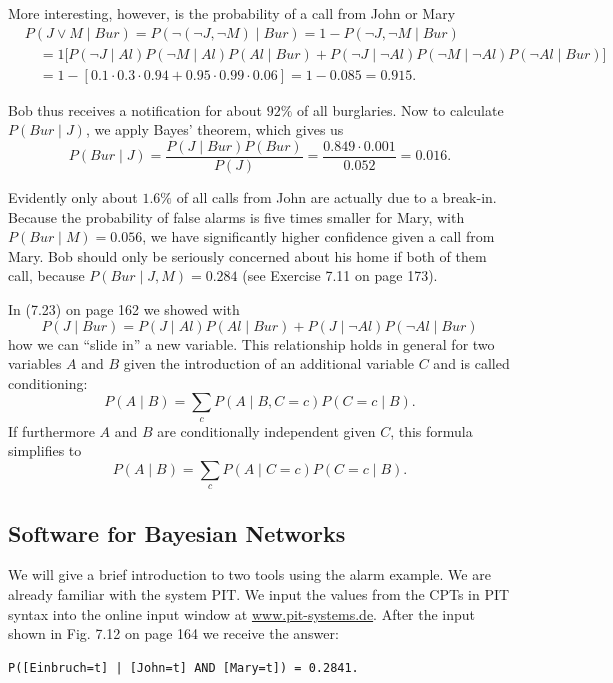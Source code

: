 \documentclass[10pt]{book}
\begin{document}
More interesting, however, is the probability of a call from John or Mary
$$
\begin{aligned}
& P(J \vee M \mid Bur)=P(\neg(\neg J, \neg M) \mid Bur)=1-P(\neg J, \neg M \mid Bur) \\
& \quad=1\bigl[P(\neg J \mid Al)P(\neg M \mid Al)P(Al \mid Bur)+P(\neg J \mid \neg Al)P(\neg M \mid \neg Al)P(\neg Al \mid Bur)\bigr] \\
& \quad=1-[0.1 \cdot 0.3 \cdot 0.94+0.95 \cdot 0.99 \cdot 0.06]=1-0.085=0.915.
\end{aligned}
$$

Bob thus receives a notification for about $92 \%$ of all burglaries. Now to calculate $P(Bur \mid J)$, we apply Bayes' theorem, which gives us
$$
P(Bur \mid J)=\frac{P(J \mid Bur)P(Bur)}{P(J)}=\frac{0.849 \cdot 0.001}{0.052}=0.016.
$$

Evidently only about $1.6 \%$ of all calls from John are actually due to a break-in. Because the probability of false alarms is five times smaller for Mary, with $P(Bur \mid M)=0.056$, we have significantly higher confidence given a call from Mary. Bob should only be seriously concerned about his home if both of them call, because $P(Bur \mid J, M)=0.284$ (see Exercise 7.11 on page 173).

In (7.23) on page 162 we showed with
$$
P(J \mid Bur)=P(J \mid Al)P(Al \mid Bur)+P(J \mid \neg Al)P(\neg Al \mid Bur)
$$
how we can ``slide in'' a new variable. This relationship holds in general for two variables $A$ and $B$ given the introduction of an additional variable $C$ and is called conditioning:
$$
P(A \mid B)=\sum_{c} P(A \mid B, C=c) P(C=c \mid B).
$$
If furthermore $A$ and $B$ are conditionally independent given $C$, this formula simplifies to
$$
P(A \mid B)=\sum_{c} P(A \mid C=c) P(C=c \mid B).
$$

\subsection{Software for Bayesian Networks}
We will give a brief introduction to two tools using the alarm example. We are already familiar with the system PIT. We input the values from the CPTs in PIT syntax into the online input window at \href{http://www.pit-systems.de}{www.pit-systems.de}. After the input shown in Fig. 7.12 on page 164 we receive the answer:
\begin{verbatim}
P([Einbruch=t] | [John=t] AND [Mary=t]) = 0.2841.
\end{verbatim}
\end{document}
